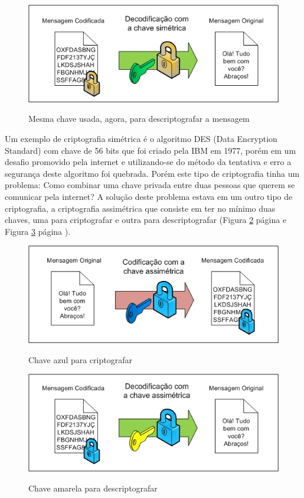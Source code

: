 \documentclass[12pt]{article}
\begin{document}
\begin{figure}[!h]
\centering
\includegraphics[scale = .5]{simetrica2}
\caption{Mesma chave usada, agora, para descriptografar a mensagem}
\label{4}
\cite{ufrj}
\end{figure}

Um exemplo de criptografia sim\'{e}trica \'{e} o algoritmo DES (Data Encryption Standard) com chave de 56 bits que foi criado pela IBM em 1977, por\'{e}m em um desafio promovido pela internet e utilizando-se do m\'{e}todo da tentativa e erro a seguran\c ca deste algoritmo foi quebrada. Por\'{e}m este tipo de criptografia tinha um problema: Como combinar uma chave privada entre duas pessoas que querem se comunicar pela internet? A solu\c c\~{a}o deste problema estava em um outro tipo de criptografia, a criptografia assim\'{e}trica que consiste em ter no m\'{i}nimo duas chaves, uma para criptografar e outra para descriptografar (Figura \ref{5} p\'{a}gina \pageref{5} e Figura \ref{6} p\'{a}gina \pageref{6}).
\begin{figure}[!h]
\centering
\includegraphics[scale = .5]{asimetrica1}
\caption{Chave azul para criptografar}
\label{5}
\cite{ufrj}
\end{figure}
\begin{figure}[!h]
\centering
\includegraphics[scale = .5]{asimetrica2}
\caption{Chave amarela para descriptografar}
\label{6}
\cite{ufrj}
\end{figure}
\pagebreak
\end{document}
